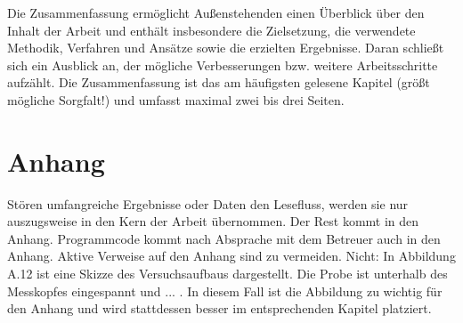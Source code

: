Die Zusammenfassung ermöglicht Außenstehenden einen Überblick über den Inhalt der Arbeit und enthält insbesondere die Zielsetzung, die verwendete Methodik, Verfahren und Ansätze sowie die erzielten Ergebnisse. Daran schließt sich ein Ausblick an, der mögliche Verbesserungen bzw. weitere Arbeitsschritte aufzählt. Die Zusammenfassung ist das am häufigsten gelesene Kapitel (größt mögliche Sorgfalt!) und umfasst maximal zwei bis drei Seiten.

\section{Anhang}

Stören umfangreiche Ergebnisse oder Daten den Lesefluss, werden sie nur auszugsweise in den Kern der Arbeit übernommen. Der Rest kommt in den Anhang. Programmcode kommt nach Absprache mit dem Betreuer auch in den Anhang. Aktive Verweise auf den Anhang sind zu vermeiden. Nicht: \glqq In Abbildung A.12 ist eine Skizze des Versuchsaufbaus dargestellt. Die Probe ist unterhalb des Messkopfes eingespannt und ... \grqq. In diesem Fall ist die Abbildung zu wichtig für den Anhang und wird stattdessen besser im entsprechenden Kapitel platziert.